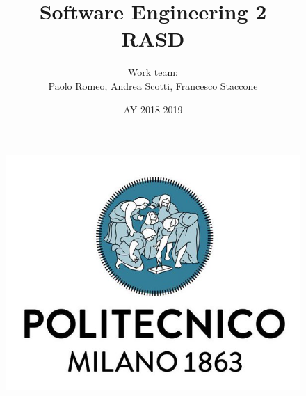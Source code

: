 \documentclass{article}
\begin{document}
	\begin{figure}
  	\includegraphics[width=\linewidth]{./images/Logo-PoliMi.jpg}
	\end{figure}
\title{\textbf{Software Engineering 2\\RASD}}
\author{Work team:\\Paolo Romeo, Andrea Scotti, Francesco Staccone}
\date{AY 2018-2019}
\maketitle{}
\end{document}
